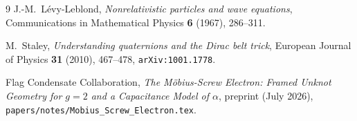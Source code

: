 \documentclass[11pt,a4paper]{article}
\begin{document}
\begin{thebibliography}{9}
J.-M.~L\'evy-Leblond,
\textit{Nonrelativistic particles and wave equations},
Communications in Mathematical Physics \textbf{6} (1967), 286--311.

M.~Staley,
\textit{Understanding quaternions and the Dirac belt trick},
European Journal of Physics \textbf{31} (2010), 467--478,
\texttt{arXiv:1001.1778}.

Flag Condensate Collaboration,
\textit{The M\"obius-Screw Electron: Framed Unknot Geometry for $g=2$ and a
Capacitance Model of $\alpha$},
preprint (July 2026),
\nolinkurl{papers/notes/Mobius_Screw_Electron.tex}.

\end{thebibliography}
\end{document}
